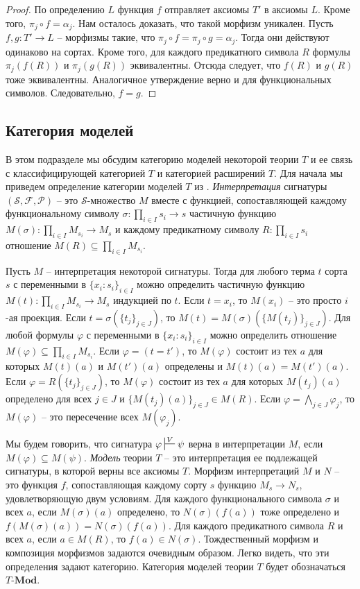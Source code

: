 \documentclass[reqno]{amsart}
\theoremstyle{definition}
\theoremstyle{remark}
\newcommand{\bcat}[1]{\mathbf{#1}}
\newcommand{\Mod}[1]{#1\text{-}\bcat{Mod}}
\begin{document}
\begin{proof}
По определению $L$ функция $f$ отправляет аксиомы $T'$ в аксиомы $L$.
Кроме того, $\pi_j \circ f = \alpha_j$.
Нам осталось доказать, что такой морфизм уникален.
Пусть $f,g : T' \to L$ -- морфизмы такие, что $\pi_j \circ f = \pi_j \circ g = \alpha_j$.
Тогда они действуют одинаково на сортах.
Кроме того, для каждого предикатного символа $R$ формулы $\pi_j(f(R))$ и $\pi_j(g(R))$ эквивалентны.
Отсюда следует, что $f(R)$ и $g(R)$ тоже эквивалентны.
Аналогичное утверждение верно и для функциональных символов.
Следовательно, $f = g$.
\end{proof}

\subsection{Категория моделей}
\label{sec:models}

В этом подразделе мы обсудим категорию моделей некоторой теории $T$ и ее связь с классифицирующей категорией $T$ и категорией расширений $T$.
Для начала мы приведем определение категории моделей $T$ из \cite{PHL}.
\emph{Интерпретация} сигнатуры $(\mathcal{S},\mathcal{F},\mathcal{P})$ -- это $\mathcal{S}$-множество $M$ вместе с функцией,
сопоставляющей каждому функциональному символу $\sigma : \prod_{i \in I} s_i \to s$ частичную функцию $M(\sigma) : \prod_{i \in I} M_{s_i} \to M_s$
и каждому предикатному символу $R : \prod_{i \in I} s_i$ отношение $M(R) \subseteq \prod_{i \in I} M_{s_i}$.

Пусть $M$ -- интерпретация некоторой сигнатуры.
Тогда для любого терма $t$ сорта $s$ с переменными в $\{ x_i : s_i \}_{i \in I}$ можно определить частичную функцию $M(t) : \prod_{i \in I} M_{s_i} \to M_s$ индукцией по $t$.
Если $t = x_i$, то $M(x_i)$ -- это просто $i$-ая проекция.
Если $t = \sigma(\{ t_j \}_{j \in J})$, то $M(t) = M(\sigma)(\{ M(t_j) \}_{j \in J})$.
Для любой формулы $\varphi$ с переменными в $\{ x_i : s_i \}_{i \in I}$ можно определить отношение $M(\varphi) \subseteq \prod_{i \in I} M_{s_i}$.
Если $\varphi = (t = t')$, то $M(\varphi)$ состоит из тех $a$ для которых $M(t)(a)$ и $M(t')(a)$ определены и $M(t)(a) = M(t')(a)$.
Если $\varphi = R(\{ t_j \}_{j \in J})$, то $M(\varphi)$ состоит из тех $a$ для которых $M(t_j)(a)$ определено для всех $j \in J$ и $\{ M(t_j)(a) \}_{j \in J} \in M(R)$.
Если $\varphi = \bigwedge_{j \in J} \varphi_j$, то $M(\varphi)$ -- это пересечение всех $M(\varphi_j)$.

Мы будем говорить, что сигнатура $\varphi \sststile{}{V} \psi$ верна в интерпретации $M$, если $M(\varphi) \subseteq M(\psi)$.
\emph{Модель} теории $T$ -- это интерпретация ее подлежащей сигнатуры, в которой верны все аксиомы $T$.
Морфизм интерпретаций $M$ и $N$ -- это функция $f$, сопоставляющая каждому сорту $s$ функцию $M_s \to N_s$, удовлетворяющую двум условиям.
Для каждого функционального символа $\sigma$ и всех $a$, если $M(\sigma)(a)$ определено, то $N(\sigma)(f(a))$ тоже определено и $f(M(\sigma)(a)) = N(\sigma)(f(a))$.
Для каждого предикатного символа $R$ и всех $a$, если $a \in M(R)$, то $f(a) \in N(\sigma)$.
Тождественный морфизм и композиция морфизмов задаются очевидным образом.
Легко видеть, что эти определения задают категорию.
Категория моделей теории $T$ будет обозначаться $\Mod{T}$.
\end{document}
